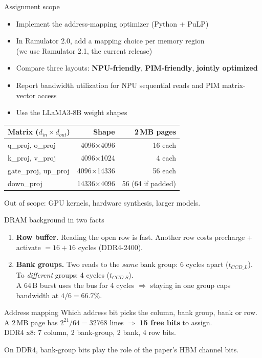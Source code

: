 \documentclass[aspectratio=169,10pt]{beamer}
\begin{document}
\begin{frame}{Assignment scope}
\begin{itemize}
\item Implement the address-mapping optimizer (Python + PuLP)
\item In Ramulator 2.0, add a mapping choice per memory region\\{\footnotesize (we use Ramulator 2.1, the current release)}
\item Compare three layouts: \textbf{NPU-friendly}, \textbf{PIM-friendly}, \textbf{jointly optimized}
\item Report bandwidth utilization for NPU sequential reads and PIM matrix-vector access
\item Use the LLaMA3-8B weight shapes
\end{itemize}
\vspace{3mm}
\begin{center}
\small
\begin{tabular}{lrr}
\toprule
Matrix ($d_{in}\times d_{out}$) & Shape & 2\,MB pages \\
\midrule
q\_proj, o\_proj & 4096$\times$4096 & 16 each \\
k\_proj, v\_proj & 4096$\times$1024 & 4 each \\
gate\_proj, up\_proj & 4096$\times$14336 & 56 each \\
down\_proj & 14336$\times$4096 & 56 (64 if padded) \\
\bottomrule
\end{tabular}
\end{center}
Out of scope: GPU kernels, hardware synthesis, larger models.
\end{frame}

\begin{frame}{DRAM background in two facts}
\begin{enumerate}
\item \textbf{Row buffer.} Reading the open row is fast. Another row costs precharge + activate $= 16+16$ cycles (DDR4-2400).
\item \textbf{Bank groups.} Two reads to the \emph{same} bank group: 6 cycles apart ($t_{CCD\_L}$). To \emph{different} groups: 4 cycles ($t_{CCD\_S}$).\\
A 64\,B burst uses the bus for 4 cycles $\Rightarrow$ staying in one group caps bandwidth at $4/6 = 66.7\%$.
\end{enumerate}
\vspace{4mm}
\begin{block}{Address mapping}
Which address bit picks the column, bank group, bank or row.\\
A 2\,MB page has $2^{21}/64 = 32768$ lines $\Rightarrow$ \textbf{15 free bits} to assign.\\
DDR4 x8: 7 column, 2 bank-group, 2 bank, 4 row bits.
\end{block}
\small On DDR4, bank-group bits play the role of the paper's HBM channel bits.
\end{frame}
\end{document}
